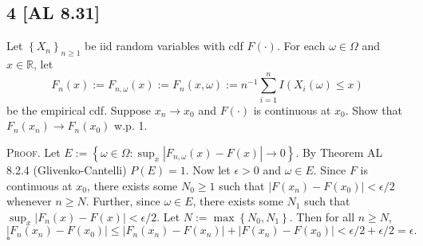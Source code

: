 \documentclass[12pt]{article}
\newcounter{ProofCounter}
\newenvironment{Proof}{\stepcounter{ProofCounter}\textsc{Proof.}}{\hfill$\square$}
\begin{document}
\newpage
\subsection*{4 [AL 8.31]}
\begin{tcolorbox}
Let $\left\{ X_{n} \right\}_{n\geq 1}$ be iid random variables with cdf $F(\cdot)$. For each $\omega \in \Omega$ and $x \in \mathbb{R}$, let
\[ F_{n}(x) := F_{n,\omega}(x) := F_{n}(x,\omega) := n^{-1}\sum_{i=1}^{n}I(X_{i}(\omega)\leq x) \]
be the empirical cdf. Suppose $x_{n} \rightarrow x_{0}$ and $F(\cdot)$ is continuous at $x_{0}$. Show that $F_{n}(x_{n}) \rightarrow
F_{n}(x_{0})$ w.p. 1.
\end{tcolorbox}
\begin{Proof}
Let $E := \left\{ \omega \in \Omega : \sup_{x}|F_{n,\omega}(x) - F(x)| \rightarrow 0\right\}$. By Theorem AL 8.2.4 (Glivenko-Cantelli) $P(E) = 1$.
Now let $\epsilon > 0$ and $\omega \in E$. Since $F$ is continuous at $x_{0}$, there exists some $N_{0} \geq 1$ such that $|F(x_{n}) - F(x_{0})| <
\epsilon / 2$ whenever $n \geq N$. Further, since $\omega \in E$, there exists some $N_{1}$ such that $\sup_{x}|F_{n}(x) - F(x)| < \epsilon / 2$.
Let $N := \max\left\{ N_{0}, N_{1} \right\}$. Then for all $n \geq N$,
\[ |F_{n}(x_{n}) - F(x_{0})| \leq |F_{n}(x_{n}) - F(x_{n})| + |F(x_{n}) - F(x_{0})| < \epsilon / 2 + \epsilon / 2 = \epsilon. \]
\end{Proof}
\end{document}
